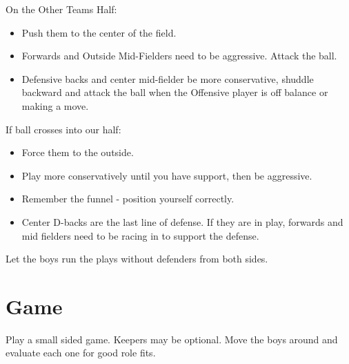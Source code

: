 \documentclass[10pt,letterpaper]{article}
\newenvironment{evenBlock}[1]{%
    \tcolorbox[beamer,%
    noparskip,breakable,
    colback=LightGreen,colframe=DarkGreen,%
    colbacklower=LimeGreen!75!LightGreen,%
    title=#1]}%
    {\endtcolorbox}
\newenvironment{oddBlock}[1]{%
    \tcolorbox[beamer,%
    noparskip,breakable,
    colback=LightBlue,colframe=DarkBlue,%
    colbacklower=DarkBlue!75!LightBlue,%
    title=#1]}%
    {\endtcolorbox}
\begin{document}
\begin{evenBlock}{Defensive Positioning}
    On the Other Teams Half:
    \begin{itemize}
        \item Push them to the center of the field.
        \item Forwards and Outside Mid-Fielders need to be aggressive.  Attack the ball.
        \item Defensive backs and center mid-fielder be more conservative, shuddle backward and attack the ball when the Offensive player is off balance or making a move.
    \end{itemize}
    If ball crosses into our half:
    \begin{itemize}
        \item Force them to the outside.
        \item Play more conservatively until you have support, then be aggressive.
        \item Remember the funnel - position yourself correctly.
        \item Center D-backs are the last line of defense.  If they are in play, forwards and mid fielders need to be racing in to support the defense.
    \end{itemize}
\end{evenBlock}

\begin{oddBlock}{Try It}
    Let the boys run the plays without defenders from both sides.
\end{oddBlock}

\section{Game}

\begin{evenBlock}{Small Sided Game (15 min)}
    Play a small sided game.  Keepers may be optional. Move the boys around and evaluate each one for good role fits.
\end{evenBlock}
\end{document}
